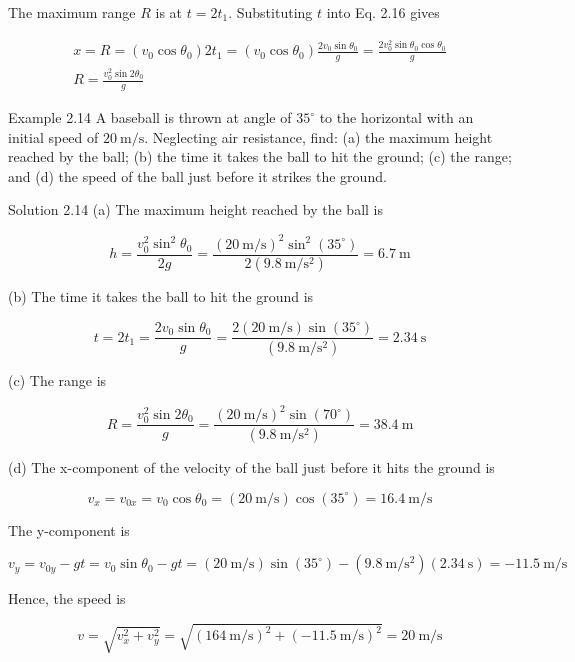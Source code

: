 \documentclass[10pt]{article}
\begin{document}
The maximum range $R$ is at $t=2 t_{1}$. Substituting $t$ into Eq. 2.16 gives

$$
\begin{gathered}
x=R=\left(v_{0} \cos \theta_{0}\right) 2 t_{1}=\left(v_{0} \cos \theta_{0}\right) \frac{2 v_{0} \sin \theta_{0}}{g}=\frac{2 v_{0}^{2} \sin \theta_{0} \cos \theta_{0}}{g} \\
R=\frac{v_{0}^{2} \sin 2 \theta_{0}}{g}
\end{gathered}
$$

Example 2.14 A baseball is thrown at angle of $35^{\circ}$ to the horizontal with an initial speed of $20 \mathrm{~m} / \mathrm{s}$. Neglecting air resistance, find: (a) the maximum height reached by the ball; (b) the time it takes the ball to hit the ground; (c) the range; and (d) the speed of the ball just before it strikes the ground.

Solution 2.14 (a) The maximum height reached by the ball is

$$
h=\frac{v_{0}^{2} \sin ^{2} \theta_{0}}{2 g}=\frac{(20 \mathrm{~m} / \mathrm{s})^{2} \sin ^{2}\left(35^{\circ}\right)}{2\left(9.8 \mathrm{~m} / \mathrm{s}^{2}\right)}=6.7 \mathrm{~m}
$$

(b) The time it takes the ball to hit the ground is

$$
t=2 t_{1}=\frac{2 v_{0} \sin \theta_{0}}{g}=\frac{2(20 \mathrm{~m} / \mathrm{s}) \sin \left(35^{\circ}\right)}{\left(9.8 \mathrm{~m} / \mathrm{s}^{2}\right)}=2.34 \mathrm{~s}
$$

(c) The range is

$$
R=\frac{v_{0}^{2} \sin 2 \theta_{0}}{g}=\frac{(20 \mathrm{~m} / \mathrm{s})^{2} \sin \left(70^{\circ}\right)}{\left(9.8 \mathrm{~m} / \mathrm{s}^{2}\right)}=38.4 \mathrm{~m}
$$

(d) The x-component of the velocity of the ball just before it hits the ground is

$$
v_{x}=v_{0 x}=v_{0} \cos \theta_{0}=(20 \mathrm{~m} / \mathrm{s}) \cos \left(35^{\circ}\right)=16.4 \mathrm{~m} / \mathrm{s}
$$

The y-component is

$$
v_{y}=v_{0 y}-g t=v_{0} \sin \theta_{0}-g t=(20 \mathrm{~m} / \mathrm{s}) \sin \left(35^{\circ}\right)-\left(9.8 \mathrm{~m} / \mathrm{s}^{2}\right)(2.34 \mathrm{~s})=-11.5 \mathrm{~m} / \mathrm{s}
$$

Hence, the speed is

$$
v=\sqrt{v_{x}^{2}+v_{y}^{2}}=\sqrt{(164 \mathrm{~m} / \mathrm{s})^{2}+(-11.5 \mathrm{~m} / \mathrm{s})^{2}}=20 \mathrm{~m} / \mathrm{s}
$$
\end{document}
